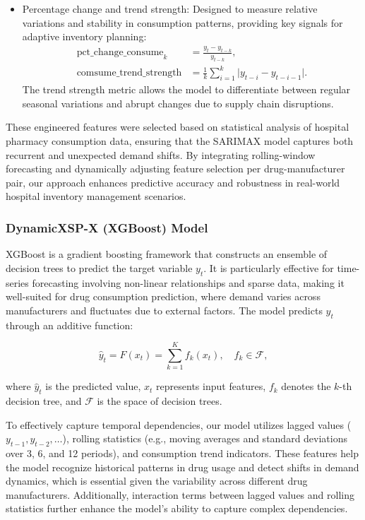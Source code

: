 \documentclass[journal]{IEEEtran}
\begin{document}
\begin{itemize}
    \item Percentage change and trend strength: Designed to measure relative variations and stability in consumption patterns, providing key signals for adaptive inventory planning:
    \begin{align}
    \text{pct\_change\_consume}_{k} &= \frac{y_{t} - y_{t-k}}{y_{t-k}}, \\
    \text{comsume\_trend\_strength} &= \frac{1}{k} \sum_{i=1}^{k} \lvert y_{t-i} - y_{t-i-1} \rvert.
    \end{align}
    The trend strength metric allows the model to differentiate between regular seasonal variations and abrupt changes due to supply chain disruptions.
\end{itemize}

These engineered features were selected based on statistical analysis of hospital pharmacy consumption data, ensuring that the SARIMAX model captures both recurrent and unexpected demand shifts. By integrating rolling-window forecasting and dynamically adjusting feature selection per drug-manufacturer pair, our approach enhances predictive accuracy and robustness in real-world hospital inventory management scenarios.

\subsubsection{DynamicXSP-X (XGBoost) Model}

XGBoost is a gradient boosting framework that constructs an ensemble of decision trees to predict the target variable \(y_t\). It is particularly effective for time-series forecasting involving non-linear relationships and sparse data, making it well-suited for drug consumption prediction, where demand varies across manufacturers and fluctuates due to external factors. The model predicts \(y_t\) through an additive function:

\begin{equation}
\hat{y}_{t} = F(x_{t}) = \sum_{k=1}^{K} f_{k}(x_{t}), \quad f_{k} \in \mathcal{F},
\end{equation}

where \(\hat{y}_{t}\) is the predicted value, \(x_{t}\) represents input features, \(f_{k}\) denotes the \(k\)-th decision tree, and \(\mathcal{F}\) is the space of decision trees.

To effectively capture temporal dependencies, our model utilizes lagged values (\(y_{t-1}, y_{t-2}, \dots\)), rolling statistics (e.g., moving averages and standard deviations over 3, 6, and 12 periods), and consumption trend indicators. These features help the model recognize historical patterns in drug usage and detect shifts in demand dynamics, which is essential given the variability across different drug manufacturers. Additionally, interaction terms between lagged values and rolling statistics further enhance the model's ability to capture complex dependencies.
\end{document}

